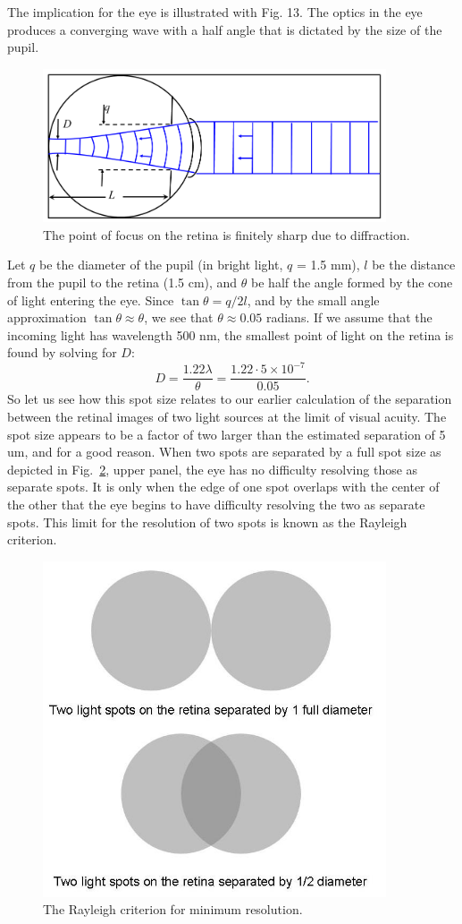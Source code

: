 The implication for the eye is illustrated with Fig. 13. The optics in the eye produces a converging wave with a half angle that is dictated by the size of the pupil. 
\begin{figure}[h]
	\centering
	\includegraphics[width=4.0in]{./figures/Topic5/Fig5-13.png}
	\caption{The point of focus on the retina is finitely sharp due to diffraction.}
	\label{Fig5-13}
\end{figure}  
Let $q$ be the diameter of the pupil (in bright light, $q$ = 1.5 mm), $l$ be the distance from the pupil to the retina (1.5 cm), and $\theta$ be half the angle formed by the cone of light entering the eye.  Since $\tan\theta=q/2l$, and by the small angle approximation $\tan\theta\approx\theta$, we see that $\theta\approx0.05$ radians.  If we assume that the incoming light has wavelength 500 nm, the smallest point of light on the retina is found by solving for $D$:
$$D = \frac{1.22\lambda}{\theta}=\frac{1.22\cdot 5\times10^{-7}}{0.05}.$$
So let us see how this spot size relates to our earlier calculation of the separation between the retinal images of two light sources at the limit of visual acuity. The spot size appears to be a factor of two larger than the estimated separation of 5 um, and for a good reason. When two spots are separated by a full spot size as depicted in Fig.~\ref{Fig5-14}, upper panel, the eye has no difficulty resolving those as separate spots. It is only when the edge of one spot overlaps with the center of the other that the eye begins to have difficulty resolving the two as separate spots. This limit for the resolution of two spots is known as the Rayleigh criterion.
\begin{figure}[h]
	\centering
	\includegraphics[width=4.0in]{./figures/Topic5/Fig5-14.jpg}
	\caption{The Rayleigh criterion for minimum resolution.}
	\label{Fig5-14}
\end{figure}

